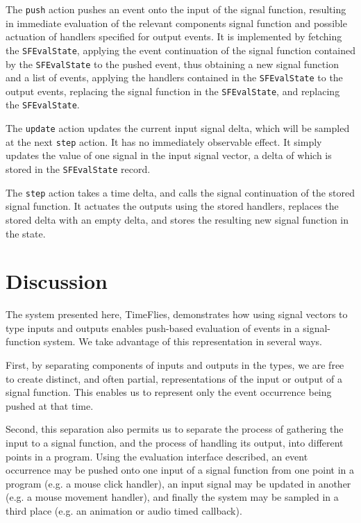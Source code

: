 \documentclass[draft]{llncs}
\begin{document}
The {\tt push} action pushes an event onto the input of the signal function,
resulting in immediate evaluation of the relevant components signal function
and possible actuation of handlers specified for output events. It is
implemented by fetching the {\tt SFEvalState}, applying the event continuation
of the signal function contained by the {\tt SFEvalState} to the pushed event,
thus obtaining a new signal function and a list of events, applying the handlers
contained in the {\tt SFEvalState} to the output events, replacing the signal
function in the {\tt SFEvalState}, and replacing the {\tt SFEvalState}.

The {\tt update} action updates the current input signal delta, which will be
sampled at the next {\tt step} action. It has no immediately observable effect.
It simply updates the value of one signal in the input signal vector, a delta
of which is stored in the {\tt SFEvalState} record.

The {\tt step} action takes a time delta, and calls the signal continuation of
the stored signal function. It actuates the outputs using the stored handlers,
replaces the stored delta with an empty delta, and stores the resulting new
signal function in the state.

\section{Discussion}
\label{section:Discussion}

The system presented here, TimeFlies, demonstrates how using signal vectors
to type inputs and outputs enables push-based evaluation of events in a
signal-function system. We take advantage of this representation in several ways.

First, by separating components of inputs and outputs in the types, we are free
to create distinct, and often partial, representations of the input or output
of a signal function. This enables us to represent only the event occurrence
being pushed at that time.

Second, this separation also permits us to separate the process of gathering
the input to a signal function, and the process of handling its output, into
different points in a program. Using the evaluation interface described, an
event occurrence may be pushed onto one input of a signal function from one
point in a program (e.g. a mouse click handler), an input signal
may be updated in another (e.g. a mouse movement handler), and finally the
system may be sampled in a third place (e.g. an animation or audio timed
callback).
\end{document}
